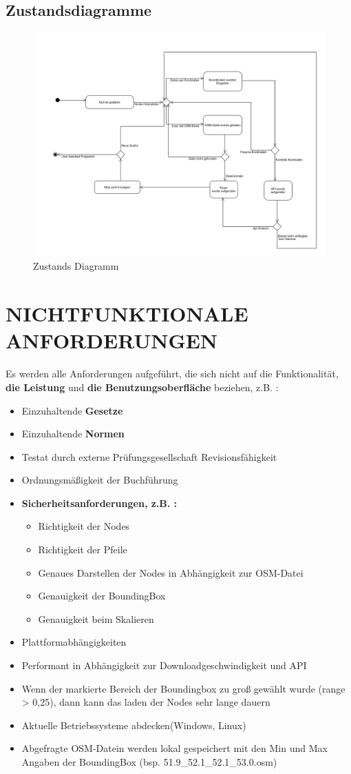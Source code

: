 	\subsection{Zustandsdiagramme}
	\begin{figure}[H]
	\centering
	\includegraphics[width=0.7\linewidth]{images/Zustandsdiagramm}
	\caption{Zustands Diagramm}
	\label{fig:Zustands Diagramm}
	\end{figure}
	
	\section{\Large NICHTFUNKTIONALE ANFORDERUNGEN}
	Es werden alle Anforderungen aufgeführt, die sich nicht auf die Funktionalität, \textbf{ die Leistung} und \textbf{ die Benutzungsoberfläche} beziehen, z.B. :
	\begin{itemize}
		\item Einzuhaltende \textbf{Gesetze}
		\item Einzuhaltende \textbf{Normen}
		\item Testat durch externe Prüfungsgesellschaft
		Revisionsfähigkeit 
		\item Ordnungsmäßigkeit der Buchführung
		\item \textbf{ Sicherheitsanforderungen, z.B. :}
		\begin{itemize}
			\item Richtigkeit der Nodes
			\item Richtigkeit der Pfeile
			\item Genaues Darstellen der Nodes in Abhängigkeit zur OSM-Datei
			\item Genauigkeit der BoundingBox
			\item Genauigkeit beim Skalieren
		\end{itemize}  
		\item Plattformabhängigkeiten
		\item Performant in Abhängigkeit zur Downloadgeschwindigkeit und API
		\item Wenn der markierte Bereich der Boundingbox zu groß gewählt wurde (range > 0,25), dann kann das laden der Nodes sehr lange dauern
		\item Aktuelle Betriebssysteme abdecken(Windows, Linux)
		\item Abgefragte OSM-Datein werden lokal gespeichert mit den Min und Max Angaben der BoundingBox	(bsp. 51.9\_52.1\_52.1\_53.0.osm) 
	\end{itemize} 

